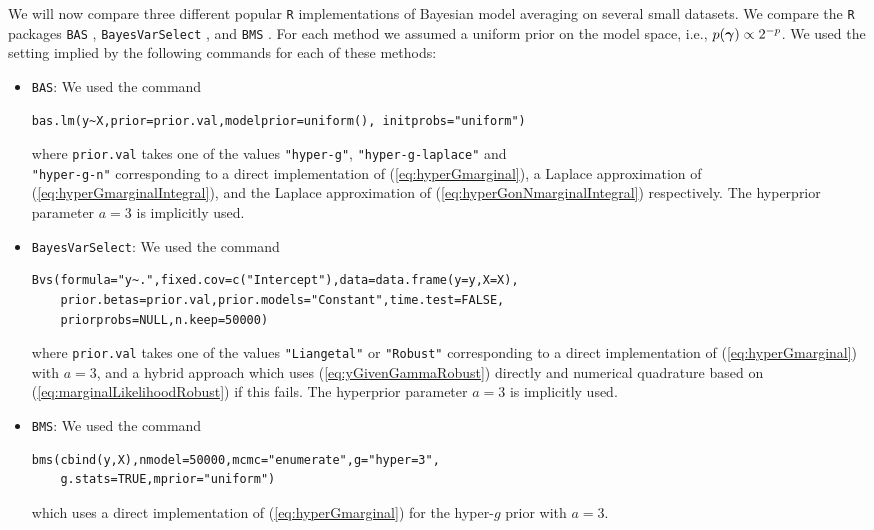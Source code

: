 \documentclass{article}[12pt]
\begin{document}
We will now compare three different popular {\tt R} implementations of Bayesian model averaging on 
several small datasets. We compare the {\tt R} packages {\tt BAS} \citep{Clyde2017}, 
{\tt BayesVarSelect} \citep{Garcia-Donato2016}, and  {\tt BMS} \citep{Zeugner2015}. For each method
we assumed a uniform prior on the model space, i.e., $p({\boldsymbol \gamma})\propto 2^{-p}$. We used the
setting implied by the following commands for each of these methods:
\begin{itemize}
	\item {\tt BAS}: We used the command
\begin{verbatim}
bas.lm(y~X,prior=prior.val,modelprior=uniform(), initprobs="uniform")
\end{verbatim}

	where \verb|prior.val| takes one of the values \verb|"hyper-g"|, \verb|"hyper-g-laplace"| and\\ \verb|"hyper-g-n"| corresponding to a direct implementation of (\ref{eq:hyperGmarginal}),
	a Laplace approximation of (\ref{eq:hyperGmarginalIntegral}), and the 
	Laplace approximation of (\ref{eq:hyperGonNmarginalIntegral}) respectively. The
	hyperprior parameter $a=3$ is implicitly used.
	
	\item {\tt BayesVarSelect}: We used the command
\begin{verbatim}
Bvs(formula="y~.",fixed.cov=c("Intercept"),data=data.frame(y=y,X=X),
    prior.betas=prior.val,prior.models="Constant",time.test=FALSE,
    priorprobs=NULL,n.keep=50000)
\end{verbatim}

    
\noindent where \verb|prior.val| takes one of the values \verb|"Liangetal"| or \verb|"Robust"| 
corresponding to a direct implementation of (\ref{eq:hyperGmarginal}) with $a=3$, and a hybrid approach which
uses (\ref{eq:yGivenGammaRobust}) directly and numerical quadrature based on (\ref{eq:marginalLikelihoodRobust}) if this fails. The
hyperprior parameter $a=3$ is implicitly used.

\item {\tt BMS}: We used the command
\begin{verbatim}
bms(cbind(y,X),nmodel=50000,mcmc="enumerate",g="hyper=3",
    g.stats=TRUE,mprior="uniform")	
\end{verbatim}

\noindent which uses a direct implementation of (\ref{eq:hyperGmarginal}) for the hyper-$g$
prior with $a=3$.
\end{itemize}
\end{document}
